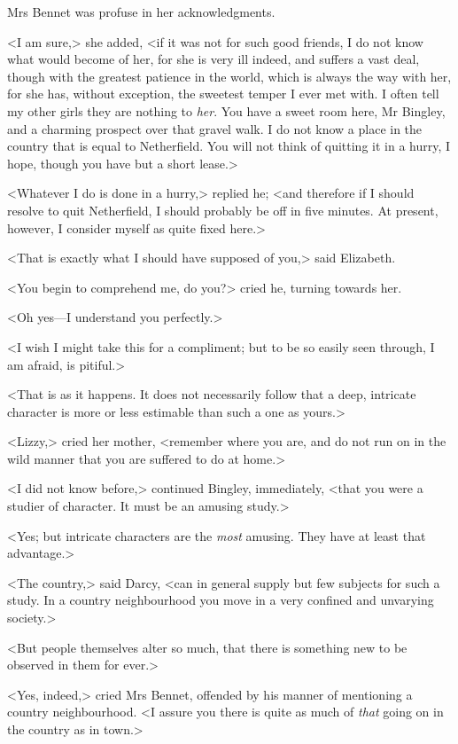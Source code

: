 Mrs Bennet was profuse in her acknowledgments.

<I am sure,> she added, <if it was not for such good friends, I do not know what would become of her, for she is very ill indeed, and suffers a vast deal, though with the greatest patience in the world, which is always the way with her, for she has, without exception, the sweetest temper I ever met with. I often tell my other girls they are nothing to \textit{her}. You have a sweet room here, Mr Bingley, and a charming prospect over that gravel walk. I do not know a place in the country that is equal to Netherfield. You will not think of quitting it in a hurry, I hope, though you have but a short lease.>

<Whatever I do is done in a hurry,> replied he; <and therefore if I should resolve to quit Netherfield, I should probably be off in five minutes. At present, however, I consider myself as quite fixed here.>

<That is exactly what I should have supposed of you,> said Elizabeth.

<You begin to comprehend me, do you?> cried he, turning towards her.

<Oh yes—I understand you perfectly.>

<I wish I might take this for a compliment; but to be so easily seen through, I am afraid, is pitiful.>

<That is as it happens. It does not necessarily follow that a deep, intricate character is more or less estimable than such a one as yours.>

<Lizzy,> cried her mother, <remember where you are, and do not run on in the wild manner that you are suffered to do at home.>

<I did not know before,> continued Bingley, immediately, <that you were a studier of character. It must be an amusing study.>

<Yes; but intricate characters are the \textit{most} amusing. They have at least that advantage.>

<The country,> said Darcy, <can in general supply but few subjects for such a study. In a country neighbourhood you move in a very confined and unvarying society.>

<But people themselves alter so much, that there is something new to be observed in them for ever.>

<Yes, indeed,> cried Mrs Bennet, offended by his manner of mentioning a country neighbourhood. <I assure you there is quite as much of \textit{that} going on in the country as in town.>

